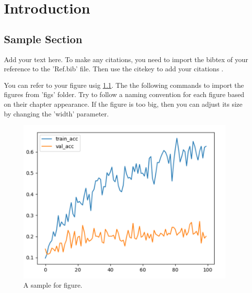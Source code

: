\chapter{Introduction}
\label{ch:intro}



\section{Sample Section}
\label{sec:ch1_section_one}
Add your text here. To make any citations, you need to import the bibtex of your reference to the 'Ref.bib' file. Then use the citekey \cite{nagothu2018microservice} to add your citations \cite{nagothu2021authenticating}.

You can refer to your figure usig \ref{fig:ch1_figure}. The the following commands to import the figures from 'figs' folder. Try to follow a naming convention for each figure based on their chapter appearance. If the figure is too big, then you can adjust its size by changing the 'width' parameter. 

\begin{figure}[t]
    \centering
        \includegraphics[width=0.98\textwidth]{figs/acc.png}
    \caption{A sample for figure.}
    \label{fig:ch1_figure}
    \vspace{-10pt}
\end{figure}


